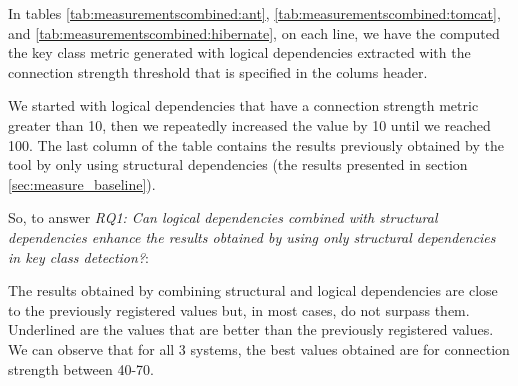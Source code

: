 \documentclass[runningheads]{comsis2}
\begin{document}
In tables \ref{tab:measurementscombined:ant}, \ref{tab:measurementscombined:tomcat}, and \ref{tab:measurementscombined:hibernate}, on each line, we have the computed the key class metric generated with logical dependencies extracted with the connection strength threshold that is specified in the colums header.

We started with logical dependencies that have a connection strength metric greater than 10, then we repeatedly increased the value by 10 until we reached 100. The last column of the table contains the results previously obtained by the tool by only using structural dependencies (the results presented in section \ref{sec:measure_baseline}).

So, to answer \textit{RQ1: Can logical dependencies combined with structural dependencies enhance the results obtained by using only structural dependencies in key class detection?}:

The results obtained by combining structural and logical dependencies are close to the previously registered values but, in most cases, do not surpass them. Underlined are the values that are better than the previously registered values. We can observe that for all 3 systems, the best values obtained are for connection strength between 40-70.

\begin{table}[!h]
\setlength\tabcolsep{3.5pt}
\caption{Measurements for Ant using structural and logical dependencies combined}
\label{tab:measurementscombined:ant}
\centering
{}
\end{table}
\end{document}
